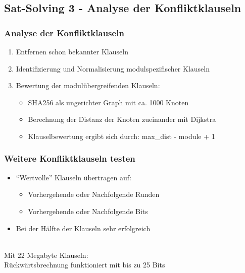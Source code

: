 \documentclass{beamer}
\begin{document}
  \subsection{Sat-Solving 3 - Analyse der Konfliktklauseln}
    \begin{frame}
      \frametitle{Analyse der Konfliktklauseln}
      \begin{enumerate}
        \setlength{\itemsep}{20pt}
        \item Entfernen schon bekannter Klauseln
        \item Identifizierung und Normalisierung modulspezifischer Klauseln
        \item Bewertung der modulübergreifenden Klauseln:
        \begin{itemize}
          \item SHA256 als ungerichter Graph mit ca. 1000 Knoten
          \item Berechnung der Distanz der Knoten zueinander mit Dijkstra
          \item Klauselbewertung ergibt sich durch: max\_dist - module + 1
        \end{itemize}
      \end{enumerate}
    \end{frame}
    \begin{frame}
      \frametitle{Weitere Konfliktklauseln testen}
      \begin{itemize}
        \setlength{\itemsep}{20pt}
        \item "`Wertvolle"' Klauseln übertragen auf:
        \begin{itemize}
          \item Vorhergehende oder Nachfolgende Runden
          \item Vorhergehende oder Nachfolgende Bits
        \end{itemize}
        \item Bei der Hälfte der Klauseln sehr erfolgreich
      \end{itemize}
      \pause
      ~\\
      Mit 22 Megabyte Klauseln:\\
      Rückwärtsbrechnung funktioniert mit bis zu 25 Bits
    \end{frame}
\end{document}
